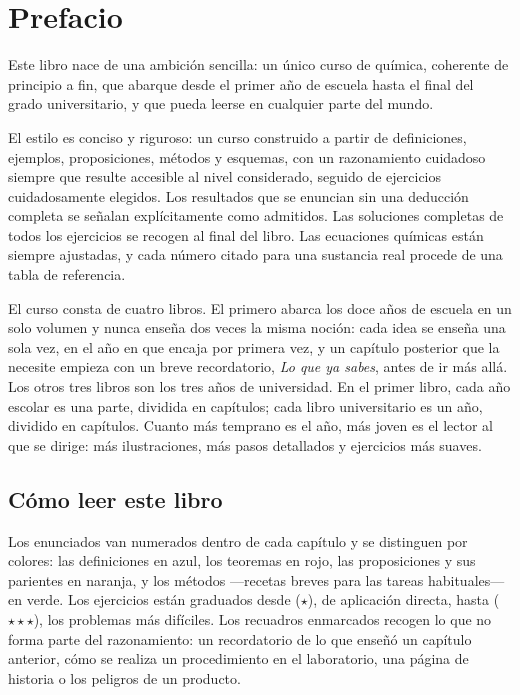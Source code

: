\chapter{Prefacio}

Este libro nace de una ambición sencilla: un único curso de química,
coherente de principio a fin, que abarque desde el primer año de escuela
hasta el final del grado universitario, y que pueda leerse en cualquier
parte del mundo.

El estilo es conciso y riguroso: un curso construido a partir de
definiciones, ejemplos, proposiciones, métodos y esquemas, con un
razonamiento cuidadoso siempre que resulte accesible al nivel
considerado, seguido de ejercicios cuidadosamente elegidos. Los
resultados que se enuncian sin una deducción completa se señalan
explícitamente como admitidos. Las soluciones completas de todos los
ejercicios se recogen al final del libro. Las ecuaciones químicas están
siempre ajustadas, y cada número citado para una sustancia real procede
de una tabla de referencia.

El curso consta de cuatro libros. El primero abarca los doce años de
escuela en un solo volumen y nunca enseña dos veces la misma noción: cada
idea se enseña una sola vez, en el año en que encaja por primera vez, y un
capítulo posterior que la necesite empieza con un breve recordatorio,
\emph{Lo que ya sabes}, antes de ir más allá. Los otros tres libros son
los tres años de universidad. En el primer libro, cada año escolar es una
parte, dividida en capítulos; cada libro universitario es un año,
dividido en capítulos. Cuanto más temprano es el año, más joven es el
lector al que se dirige: más ilustraciones, más pasos detallados y
ejercicios más suaves.

\section*{Cómo leer este libro}

Los enunciados van numerados dentro de cada capítulo y se distinguen por
colores: las definiciones en azul, los teoremas en rojo, las
proposiciones y sus parientes en naranja, y los métodos ---recetas
breves para las tareas habituales--- en verde. Los ejercicios están
graduados desde ($\star$), de aplicación directa, hasta
($\star\star\star$), los problemas más difíciles. Los recuadros
enmarcados recogen lo que no forma parte del razonamiento: un
recordatorio de lo que enseñó un capítulo anterior, cómo se realiza un
procedimiento en el laboratorio, una página de historia o los peligros de
un producto.

